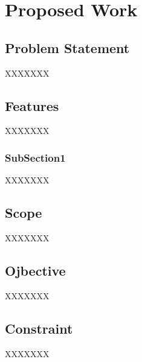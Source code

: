 \chapter{Proposed Work}

\section{Problem Statement}
XXXXXXX

\section{Features}
XXXXXXX
\subsection{SubSection1}
XXXXXXX

\section{Scope}
XXXXXXX

\section{Ojbective}
XXXXXXX
\section{Constraint}
XXXXXXX